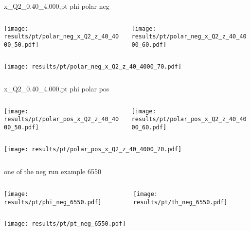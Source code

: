 \begin{frame}{x\_Q2\_0.40\_4.000,pt phi polar neg}
\begin{columns}
\begin{column}[T]{0.5\textwidth}
\texttt{[image: results/pt/polar\_neg\_x\_Q2\_z\_40\_4000\_50.pdf]}
\end{column}
\begin{column}[T]{0.5\textwidth}
\texttt{[image: results/pt/polar\_neg\_x\_Q2\_z\_40\_4000\_60.pdf]}
\end{column}
\end{columns}
\begin{columns}
\begin{column}[T]{0.5\textwidth}
\texttt{[image: results/pt/polar\_neg\_x\_Q2\_z\_40\_4000\_70.pdf]}
\end{column}
\begin{column}[T]{0.5\textwidth}
\end{column}
\end{columns}
\end{frame}
\begin{frame}{x\_Q2\_0.40\_4.000,pt phi polar pos}
\begin{columns}
\begin{column}[T]{0.5\textwidth}
\texttt{[image: results/pt/polar\_pos\_x\_Q2\_z\_40\_4000\_50.pdf]}
\end{column}
\begin{column}[T]{0.5\textwidth}
\texttt{[image: results/pt/polar\_pos\_x\_Q2\_z\_40\_4000\_60.pdf]}
\end{column}
\end{columns}
\begin{columns}
\begin{column}[T]{0.5\textwidth}
\texttt{[image: results/pt/polar\_pos\_x\_Q2\_z\_40\_4000\_70.pdf]}
\end{column}
\begin{column}[T]{0.5\textwidth}
\end{column}
\end{columns}
\end{frame}
\begin{frame}{one of the neg run example 6550}
\begin{columns}
\begin{column}[T]{0.5\textwidth}
\texttt{[image: results/pt/phi\_neg\_6550.pdf]}
\end{column}
\begin{column}[T]{0.5\textwidth}
\texttt{[image: results/pt/th\_neg\_6550.pdf]}
\end{column}
\end{columns}
\begin{columns}
\begin{column}[T]{0.5\textwidth}
\texttt{[image: results/pt/pt\_neg\_6550.pdf]}
\end{column}
\begin{column}[T]{0.5\textwidth}
\end{column}
\end{columns}
\end{frame}
